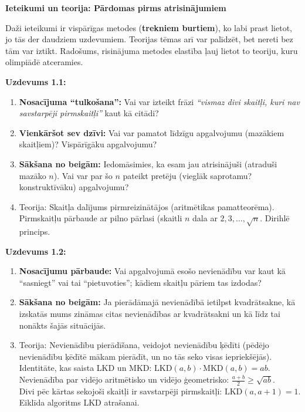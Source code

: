 \documentclass[a4paper,12pt]{article}
\begin{document}
\newpage

{\bf Ieteikumi un teorija: Pārdomas pirms atrisinājumiem}

\vspace{5pt}
Daži ieteikumi ir vispārīgas metodes ({\bf trekniem burtiem}), ko labi prast lietot, jo tās der daudziem uzdevumiem. 
Teorijas tēmas arī var palīdzēt, bet nereti bez tām var iztikt. Radošums, risinājuma metodes elastība
ļauj lietot to teoriju, kuru olimpiādē atceramies.


{\footnotesize
\vspace{5pt}
{\bf Uzdevums 1.1:} 
\begin{enumerate}
\item {\bf Nosacījuma ``tulkošana'':} Vai var izteikt frāzi {\em ``vismaz divi skaitļi, kuri nav savstarpēji pirmskaitļi''} kaut kā citādi? 
\item {\bf Vienkāršot sev dzīvi:} Vai var pamatot līdzīgu apgalvojumu (mazākiem skaitļiem)? Vispārīgāku apgalvojumu? 
\item {\bf Sākšana no beigām:} Iedomāsimies, ka esam jau atrisinājuši (atraduši mazāko $n$). Vai var par šo $n$ pateikt pretēju (vieglāk saprotamu? konstruktīvāku) apgalvojumu?
\item Teorija: Skaitļa dalījums pirmreizinātājos (aritmētikas pamatteorēma).
Pirmskaitļu pārbaude ar pilno pārlasi (skaitli $n$ dala ar $2,3,\ldots,\sqrt{n}$. 
Dirihlē princips.
\end{enumerate}


{\bf Uzdevums 1.2:} 
\begin{enumerate}
\item {\bf Nosacījumu pārbaude:} Vai apgalvojumā esošo nevienādību var kaut kā ``sasniegt'' vai tai 
``pietuvoties''; kādiem skaitļu pāriem tas izdodas? 
\item {\bf Sākšana no beigām:} Ja pierādāmajā nevienādībā ietilpst kvadrātsakne, kā izskatās
mums zināmas citas nevienādības ar kvadrātsakni un kā līdz tai nonākts šajās situācijās.
\item Teorija: Nevienādību pierādīšana, veidojot nevienādību ķēdīti (pēdējo nevienādību ķēdītē mākam pierādīt, un no tās seko 
visas iepriekšējās). Identitāte, kas saista LKD un MKD: $\mbox{LKD}(a,b) \cdot \mbox{MKD}(a,b) = ab$.\\
Nevienādība par vidējo aritmētisko un vidējo ģeometrisko: ${\displaystyle \frac{a+b}{2} \geq \sqrt{ab}}$.\\
Divi pēc kārtas sekojoši skaitļi ir savstarpēji pirmskaitļi: $\mbox{LKD}(a,a+1)=1$.\\
Eiklīda algoritms LKD atrašanai. 
\end{enumerate}


}
\end{document}
